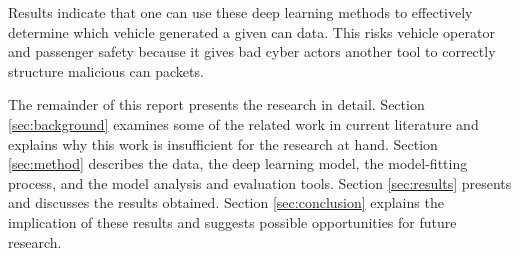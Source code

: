 \documentclass[../main.tex]{subfiles}
\begin{document}
Results indicate that one can use these deep learning methods to effectively determine which vehicle generated a given \ac{can} data. This risks vehicle operator and passenger safety because it gives bad cyber actors another tool to correctly structure malicious \ac{can} packets.


The remainder of this report presents the research in detail. Section \ref{sec:background} examines some of the related work in current literature and explains why this work is insufficient for the research at hand. Section \ref{sec:method} describes the data, the deep learning model, the model-fitting process, and the model analysis and evaluation tools. Section \ref{sec:results} presents and discusses the results obtained. Section \ref{sec:conclusion} explains the implication of these results and suggests possible opportunities for future research.
\end{document}
